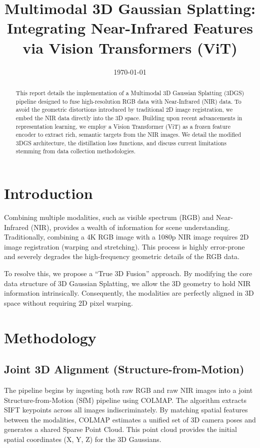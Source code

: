 \documentclass[12pt]{article}
\title{Multimodal 3D Gaussian Splatting:\\Integrating Near-Infrared Features via Vision Transformers (ViT)}
\author{}
\date{\today}
\begin{document}
\maketitle

\begin{abstract}
This report details the implementation of a Multimodal 3D Gaussian Splatting (3DGS) pipeline designed to fuse high-resolution RGB data with Near-Infrared (NIR) data. To avoid the geometric distortions introduced by traditional 2D image registration, we embed the NIR data directly into the 3D space. Building upon recent advancements in representation learning, we employ a Vision Transformer (ViT) as a frozen feature encoder to extract rich, semantic targets from the NIR images. We detail the modified 3DGS architecture, the distillation loss functions, and discuss current limitations stemming from data collection methodologies.
\end{abstract}

\section{Introduction}
Combining multiple modalities, such as visible spectrum (RGB) and Near-Infrared (NIR), provides a wealth of information for scene understanding. Traditionally, combining a 4K RGB image with a 1080p NIR image requires 2D image registration (warping and stretching). This process is highly error-prone and severely degrades the high-frequency geometric details of the RGB data.

To resolve this, we propose a ``True 3D Fusion'' approach. By modifying the core data structure of 3D Gaussian Splatting, we allow the 3D geometry to hold NIR information intrinsically. Consequently, the modalities are perfectly aligned in 3D space without requiring 2D pixel warping.

\section{Methodology}

\subsection{Joint 3D Alignment (Structure-from-Motion)}
The pipeline begins by ingesting both raw RGB and raw NIR images into a joint Structure-from-Motion (SfM) pipeline using COLMAP. The algorithm extracts SIFT keypoints across all images indiscriminately. By matching spatial features between the modalities, COLMAP estimates a unified set of 3D camera poses and generates a shared Sparse Point Cloud. This point cloud provides the initial spatial coordinates (X, Y, Z) for the 3D Gaussians.
\end{document}
